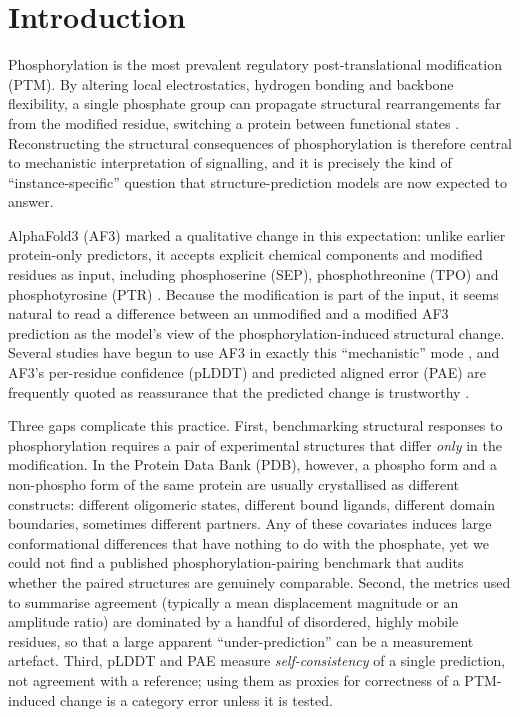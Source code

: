 \section{Introduction}
\label{sec:intro}

Phosphorylation is the most prevalent regulatory post-translational
modification (PTM). By altering local electrostatics, hydrogen bonding and
backbone flexibility, a single phosphate group can propagate structural
rearrangements far from the modified residue, switching a protein between
functional states \citep{johnson2001structural}. Reconstructing the structural
consequences of phosphorylation is therefore central to mechanistic
interpretation of signalling, and it is precisely the kind of
``instance-specific'' question that structure-prediction models are now
expected to answer.

AlphaFold3 (AF3) marked a qualitative change in this expectation: unlike
earlier protein-only predictors, it accepts explicit chemical components
and modified residues as input, including phosphoserine (SEP),
phosphothreonine (TPO) and phosphotyrosine (PTR)
\citep{abramson2024alphafold3}. Because the modification is part of the input, it seems
natural to read a difference between an unmodified and a modified AF3
prediction as the model's view of the phosphorylation-induced structural
change. Several studies have begun to use AF3 in exactly this
``mechanistic'' mode \citep{nam2026alphafold3,ramasamy2026phosphoaf3}, and AF3's per-residue
confidence (pLDDT) and predicted aligned error (PAE) are frequently quoted
as reassurance that the predicted change is trustworthy
\citep{carugo2023plddt,akdel2022structural}.

Three gaps complicate this practice. First, benchmarking structural
responses to phosphorylation requires a pair of experimental structures
that differ \emph{only} in the modification. In the Protein Data Bank
(PDB), however, a phospho form and a non-phospho form of the same protein
are usually crystallised as different constructs: different oligomeric
states, different bound ligands, different domain boundaries, sometimes
different partners. Any of these covariates induces large
conformational differences that have nothing to do with the phosphate,
yet we could not find a published phosphorylation-pairing benchmark that
audits whether the paired structures are genuinely comparable. Second,
the metrics used to summarise agreement (typically a mean displacement
magnitude or an amplitude ratio) are dominated by a handful of
disordered, highly mobile residues, so that a large apparent
``under-prediction'' can be a measurement artefact. Third, pLDDT and PAE
measure \emph{self-consistency} of a single prediction, not agreement with
a reference; using them as proxies for correctness of a PTM-induced change
is a category error unless it is tested.

